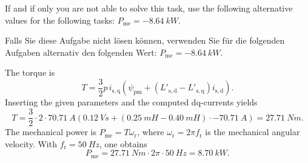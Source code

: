 \begin{hintblock}
	If and if only you are not able to solve this task, use the following alternative values for the following tasks: $P_{\mathrm{me}}=\SI{-8.64}{kW}$.
\end{hintblock}


\begin{germanhintblock}
	Falls Sie diese Aufgabe nicht lösen können, verwenden Sie für die folgenden Aufgaben alternativ den folgenden Wert: $P_{\mathrm{me}}=\SI{-8.64}{kW}$.
\end{germanhintblock}

\begin{solutionblock}
	The torque is
	\[
		T=\frac{3}{2}p\,i_{\mathrm{s,q}}\left(\psi_{\mathrm{pm}}+\left(L'_{\mathrm{s,d}}-L'_{\mathrm{s,q}}\right)i_{\mathrm{s,d}}\right).
	\]
	Inserting the given parameters and the computed dq-currents yields
	\[
		T=\frac{3}{2}\cdot 2 \cdot \SI{70.71}{A}\left(\SI{0.12}{Vs}+\left(\SI{0.25}{mH}-\SI{0.40}{mH}\right)\cdot \SI{-70.71}{A}\right)=\SI{27.71}{Nm}.
	\]
	The mechanical power is $P_{\mathrm{me}}=T\omega_{\mathrm{r}}$, where $\omega_{\mathrm{r}}=2\pi f_{\mathrm{r}}$ is the mechanical angular velocity. With $f_{\mathrm{r}}=\SI{50}{Hz}$, one obtains
	\[
		P_{\mathrm{me}}=\SI{27.71}{Nm}\cdot 2\pi \cdot \SI{50}{Hz}=\SI{8.70}{kW}.
	\]
\end{solutionblock}



